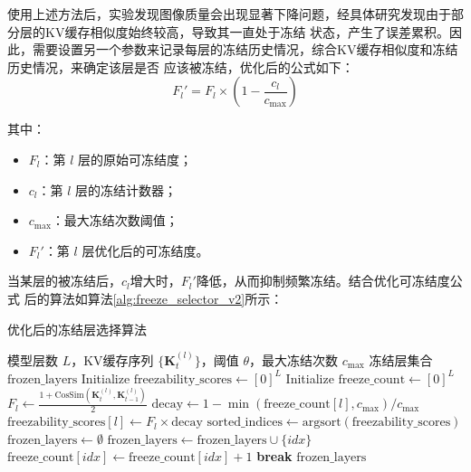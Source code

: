 \par
使用上述方法后，实验发现图像质量会出现显著下降问题，经具体研究发现由于部分层的KV缓存相似度始终较高，导致其一直处于冻结
状态，产生了误差累积。因此，需要设置另一个参数来记录每层的冻结历史情况，综合KV缓存相似度和冻结历史情况，来确定该层是否
应该被冻结，优化后的公式如下：
\begin{equation}
    F_l' = F_l \times \left(1 - \frac{c_l}{c_{\text{max}}}\right)
\end{equation}
\par
其中：
\begin{itemize}
    \item $F_l$：第 $l$ 层的原始可冻结度；
    \item $c_l$：第 $l$ 层的冻结计数器；
    \item $c_{\text{max}}$：最大冻结次数阈值；
    \item $F_l'$：第 $l$ 层优化后的可冻结度。
\end{itemize}
\par
当某层的被冻结后，$c_l$增大时，$F_l'$降低，从而抑制频繁冻结。结合优化可冻结度公式
后的算法如算法\ref{alg:freeze_selector_v2}所示：
\begin{algorithm}[!h]
    \caption{优化后的冻结层选择算法}
    \label{alg:freeze_selector_v2}
    \renewcommand{\algorithmicrequire}{\textbf{Input:}}
    \renewcommand{\algorithmicensure}{\textbf{Output:}}
    \begin{algorithmic}[1]
        \REQUIRE 模型层数 $L$，KV缓存序列 $\{\mathbf{K}_t^{(l)}\}$，阈值 $\theta$，最大冻结次数 $c_{\text{max}}$
        \ENSURE 冻结层集合 $\text{frozen\_layers}$
        \STATE Initialize $\text{freezability\_scores} \leftarrow [0]^L$
        \STATE Initialize $\text{freeze\_count} \leftarrow [0]^L$ 
            \STATE $F_l \leftarrow \frac{1 + \text{CosSim}(\mathbf{K}_t^{(l)}, \mathbf{K}_{t-1}^{(l)})}{2}$
            \STATE $\text{decay} \leftarrow 1 - \min(\text{freeze\_count}[l], c_{\text{max}}) / c_{\text{max}}$
            \STATE $\text{freezability\_scores}[l] \leftarrow F_l \times \text{decay}$
        \ENDFOR
        \STATE $\text{sorted\_indices} \leftarrow \text{argsort}(\text{freezability\_scores})$ 
        \STATE $\text{frozen\_layers} \leftarrow \emptyset$
                \STATE $\text{frozen\_layers} \leftarrow \text{frozen\_layers} \cup \{idx\}$
                \STATE $\text{freeze\_count}[idx] \leftarrow \text{freeze\_count}[idx] + 1$ 
                \STATE \textbf{break}
            \ENDIF
        \ENDFOR
        \RETURN $\text{frozen\_layers}$
    \end{algorithmic}
\end{algorithm}

